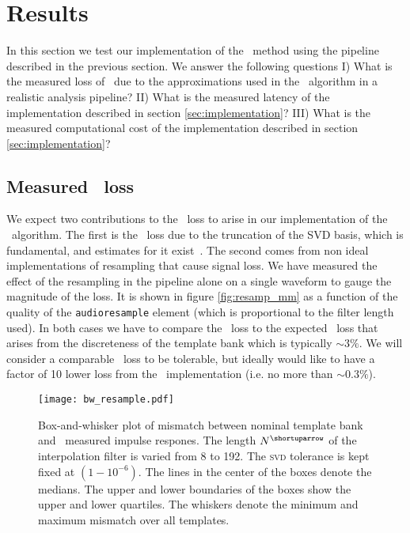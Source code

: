 \section{Results}
\label{SECIV}\label{sec:results}

In this section we test our implementation of the \lloid\ method using the
pipeline described in the previous section.  We answer the following questions
%
I) What is the measured loss of \SNR\ due to the approximations used in the
\lloid\ algorithm in a realistic analysis pipeline?
%
II) What is the measured latency of the implementation described in section
\ref{sec:implementation}?
%
III) What is the measured computational cost of the implementation described in
section \ref{sec:implementation}?

\subsection{Measured \SNR\ loss}

We expect two contributions to the \SNR\ loss to arise in our implementation of
the \lloid\ algorithm.  The first is the \SNR\ loss due to the truncation of
the SVD basis, which is fundamental, and estimates for it
exist~\cite{Cannon:2010p10398}.  The second comes from non ideal
implementations of resampling that cause signal loss.  We have measured the
effect of the resampling in the pipeline alone on a single waveform to gauge
the magnitude of the loss.  It is shown in figure \ref{fig:resamp_mm} as a
function of the quality of the {\tt audioresample} element (which is
proportional to the filter length used).  In both cases we have to compare the
\SNR\ loss to the expected \SNR\ loss that arises from the discreteness of the
template bank which is typically $\sim 3\%$.  We will consider a comparable
\SNR\ loss to be tolerable, but ideally would like to have a factor of 10 lower
loss from the \lloid\ implementation (i.e. no more than $\sim 0.3 \%$).  
%
\begin{figure}
	\label{fig:hist-interpolate}
	\begin{center}
		\texttt{[image: bw\_resample.pdf]}
		\caption{Box-and-whisker plot of mismatch between nominal template bank
		and \lloid\ measured impulse respones.  The length $N^\shortuparrow$ of
		the interpolation filter is varied from 8 to 192.  The \textsc{svd}
		tolerance is kept fixed at $(1-10^{-6})$.  The lines in the center of
		the boxes denote the medians.  The upper and lower boundaries of the
		boxes show the upper and lower quartiles.  The whiskers denote the
		minimum and maximum mismatch over all templates.}
	\end{center}
\end{figure}

